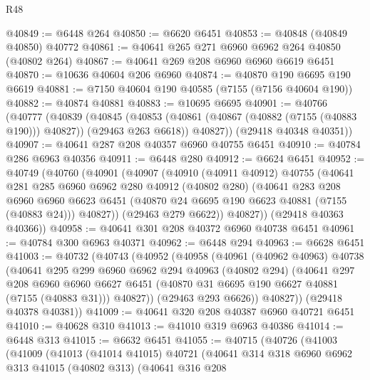 \begin{lexlean}{R48}
\begin{coremodule}
@40849 := @6448 @264
@40850 := @6620 @6451
@40853 := @40848 (@40849 @40850) @40772
@40861 := @40641 @265 @271 @6960 @6962 @264 @40850 (@40802 @264)
@40867 := @40641 @269 @208 @6960 @6960 @6619 @6451
@40870 := @10636 @40604 @206 @6960
@40874 := @40870 @190 @6695 @190 @6619
@40881 := @7150 @40604 @190 @40585 (@7155 (@7156 @40604 @190))
@40882 := @40874 @40881
@40883 := @10695 @6695
@40901 := @40766
    (@40777
      (@40839
        (@40845
          (@40853 (@40861 (@40867 (@40882 (@7155 (@40883 @190))) @40827)) (@29463 @263 @6618))
          @40827))
      (@29418 @40348 @40351))
@40907 := @40641 @287 @208 @40357 @6960 @40755 @6451
@40910 := @40784 @286 @6963 @40356
@40911 := @6448 @280
@40912 := @6624 @6451
@40952 := @40749
    (@40760
      (@40901
        (@40907
          (@40910
            (@40911 @40912)
            @40755
            (@40641
              @281
              @285
              @6960
              @6962
              @280
              @40912
              (@40802 @280)
              (@40641
                @283
                @208
                @6960
                @6960
                @6623
                @6451
                (@40870 @24 @6695 @190 @6623 @40881 (@7155 (@40883 @24)))
                @40827))
            (@29463 @279 @6622))
          @40827))
      (@29418 @40363 @40366))
@40958 := @40641 @301 @208 @40372 @6960 @40738 @6451
@40961 := @40784 @300 @6963 @40371
@40962 := @6448 @294
@40963 := @6628 @6451
@41003 := @40732
    (@40743
      (@40952
        (@40958
          (@40961
            (@40962 @40963)
            @40738
            (@40641
              @295
              @299
              @6960
              @6962
              @294
              @40963
              (@40802 @294)
              (@40641
                @297
                @208
                @6960
                @6960
                @6627
                @6451
                (@40870 @31 @6695 @190 @6627 @40881 (@7155 (@40883 @31)))
                @40827))
            (@29463 @293 @6626))
          @40827))
      (@29418 @40378 @40381))
@41009 := @40641 @320 @208 @40387 @6960 @40721 @6451
@41010 := @40628 @310
@41013 := @41010 @319 @6963 @40386
@41014 := @6448 @313
@41015 := @6632 @6451
@41055 := @40715
    (@40726
      (@41003
        (@41009
          (@41013
            (@41014 @41015)
            @40721
            (@40641
              @314
              @318
              @6960
              @6962
              @313
              @41015
              (@40802 @313)
              (@40641
                @316
                @208

\end{coremodule}
\end{lexlean}
